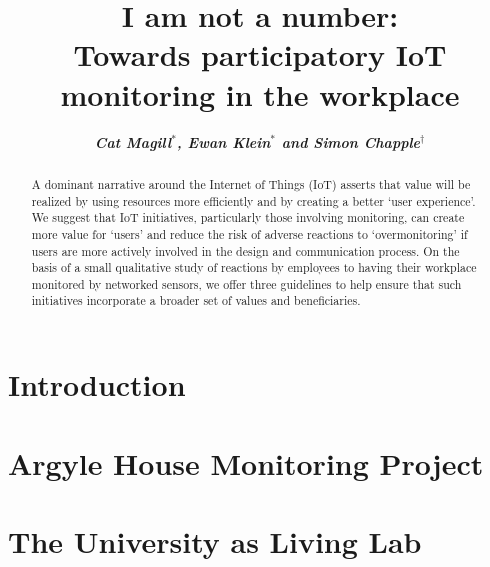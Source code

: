 \documentclass[10pt,twocolumn]{article}
\begin{document}
\title{I am not a number:\\
Towards participatory IoT monitoring in the workplace}



\author{\textbf{\textit{Cat Magill$^*$, Ewan Klein$^*$ and Simon Chapple$^\dagger$}}}
\date{}

\maketitle


\begin{abstract}
A dominant narrative around the Internet of Things (IoT) asserts that
value will be realized by using resources more efficiently and by
creating a better ‘user experience’.  We suggest that IoT initiatives,
particularly those involving monitoring, can create more value for
`users' and reduce the risk of adverse reactions to `overmonitoring'
if users are more actively involved in the design and communication
process.  On the basis of a small qualitative study of reactions by
employees to having their workplace monitored by networked sensors, we
offer three guidelines to help ensure that such initiatives
incorporate a broader set of values and beneficiaries. 
\end{abstract}



\section{Introduction}
\label{sec:introduction}



\section{Argyle House Monitoring Project}
\label{sec:argyle-house}



\section{The University as Living Lab}
\label{sec:university-as-ll}
\end{document}
